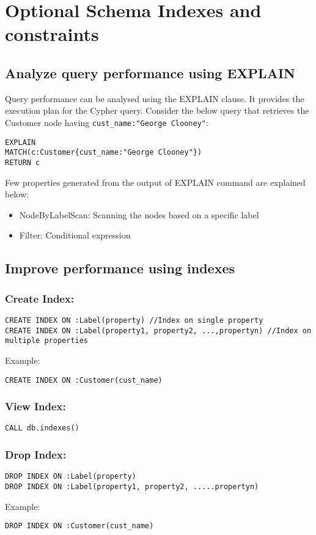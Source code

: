 \documentclass[../main.tex]{subfiles}
\begin{document}
\section{Optional Schema Indexes and constraints}
\subsection{Analyze query performance using EXPLAIN}
Query performance can be analysed using the EXPLAIN clause. It provides the execution plan for the Cypher query.
Consider the below query that retrieves the Customer node having \lstinline{cust_name:"George Clooney"}:
\begin{lstlisting}[language=cypher]
EXPLAIN
MATCH(c:Customer{cust_name:"George Clooney"})
RETURN c
\end{lstlisting}
Few properties generated from the output of EXPLAIN command are explained below:
\begin{itemize}
	\item NodeByLabelScan: Scanning the nodes based on a specific label
	\item Filter: Conditional expression
\end{itemize}
\subsection{Improve performance using indexes}
\subsubsection{Create Index:}
\begin{lstlisting}[language=cypher]
CREATE INDEX ON :Label(property) //Index on single property 
CREATE INDEX ON :Label(property1, property2, ...,propertyn) //Index on multiple properties
\end{lstlisting}
Example:
\begin{lstlisting}[language=cypher]
CREATE INDEX ON :Customer(cust_name)
\end{lstlisting}
\subsubsection{View Index:}
\begin{lstlisting}[language=cypher]
CALL db.indexes()
\end{lstlisting}

\subsubsection{Drop Index:}
\begin{lstlisting}[language=cypher]
DROP INDEX ON :Label(property)
DROP INDEX ON :Label(property1, property2, .....propertyn)
\end{lstlisting}
Example: 
\begin{lstlisting}[language=cypher]
DROP INDEX ON :Customer(cust_name)
\end{lstlisting}
\end{document}
